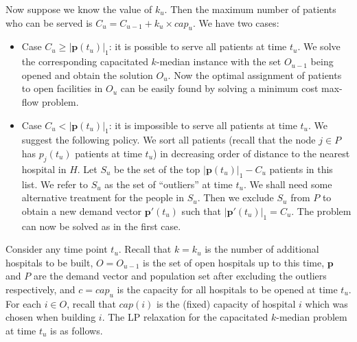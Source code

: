 Now suppose we know the value of $k_u$. Then the maximum number of patients who can be served is $C_u = C_{u-1} + k_u \times cap_u$. We have two cases:
\begin{itemize}
	\item Case $C_u \geq |\mathbf{p}(t_u)|_1$: it is possible to serve all patients at time $t_u$. We solve the corresponding capacitated $k$-median instance with the set $O_{u-1}$ being opened and obtain the solution $O_u$. Now the optimal assignment of patients to open facilities in $O_u$ can be easily found by solving a minimum cost max-flow problem.
	
	\item Case $C_u < |\mathbf{p}(t_u)|_1$: it is impossible to serve all patients at time $t_u$. We suggest the following policy. We sort all patients (recall that the node $j \in P$ has $p_j(t_u)$ patients at time $t_u$) in decreasing order of distance to the nearest hospital in $H$. Let $S_u$ be the set of the top $|\mathbf{p}(t_u)|_1 - C_u$ patients in this list. We refer to $S_u$ as the set of ``outliers'' at time $t_u$. We shall need some alternative treatment for the people in $S_u$. Then we exclude $S_u$ from $P$ to obtain a new demand vector $\mathbf{p}'(t_u)$ such that $|\mathbf{p}'(t_u)|_1 = C_u$. The problem can now be solved as in the first case.
	
\end{itemize}





Consider any time point $t_u$. Recall that $k = k_u$ is the number of additional hospitals to be built, $O = O_{u-1}$ is the set of open hospitals up to this time, $\mathbf{p}$ and $P$ are the demand vector and population set after excluding the outliers respectively, and $c = cap_u$ is the capacity for all hospitals to be opened at time $t_u$. For each $i \in O$, recall that $cap(i)$ is the (fixed) capacity of hospital $i$ which was chosen when building $i$. The LP relaxation for the capacitated $k$-median problem at time $t_u$ is as follows.

